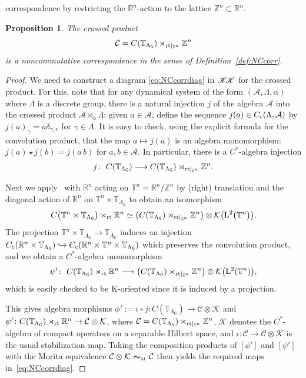 \documentclass[pdftex]{sigma}
\numberwithin{equation}{section}
\newcommand{\Z}{\zed}
\newcommand{\mbf}[1]{{\boldsymbol {#1} }}
\newcommand{\CCK}{\mathscr{K}}
\newcommand{\CK}{\mathcal{K}}
\newcommand{\Ccal}{\mathcal{C}}
\newcommand{\sfG}{\mathsf{G}}
\newcommand{\Leb}{{\rm L}}
\newcommand{\rt}{{\rm rt}}
\newcommand{\zed}{{\mathbb Z}} %
\newcommand{\real}{{\mathbb R}} %
\newcommand{\torus}{{\mathbb T}} %
\def\alg{{\mathcal A}}
\newtheorem{Proposition}[Theorem]{Proposition}
 { \theoremstyle{definition}
\newtheorem{Definition}[Theorem]{Definition}
\newtheorem{Note}[Theorem]{Note}
\newtheorem{Example}[Theorem]{Example}
\newtheorem{Remark}[Theorem]{Remark} }
\begin{document}
correspondence by restricting the $\real^n$-action to the lattice
$\zed^n\subset\real^n$.
\begin{Proposition}\label{prop:NCcorr}
The crossed product
\[
\Ccal=C(\torus_{\Lambda_\sfG})\rtimes_{\rt|_{\zed^n}} \zed^n
\]
is a {noncommutative correspondence} in the sense of
Definition~\ref{def:NCcorr}.
\end{Proposition}
\begin{proof}
We need to construct a diagram \eqref{eq:NCcorrdiag} in $\CCK\hspace{-1mm}\CCK$ for the
crossed product. For this,
note that for any dynamical system of the form $(\alg,\Lambda,\alpha)$
where $\Lambda$ is a discrete group, there is a
natural injection $j$ of the algebra $\alg$ into the crossed product
$\alg\rtimes_\alpha\Lambda$: given $a\in\alg$, define the sequence
$j(a)\in C_{\rm c}(\Lambda,\alg)$ by $j(a)_{\gamma}=a \delta_{\gamma,e}$ for $\gamma\in\Lambda$. It is
easy to check, using the explicit formula for the convolution product,
that the map $a\mapsto j(a)$ is an algebra
monomorphism:
$j(a)\star j(b)=j(a\,b)$ for $a,b\in\alg$. In particular,
there is a $C^*$-algebra injection
\begin{gather}\label{eq:jmono}
j\colon \ C(\torus_{\Lambda_\sfG})\longrightarrow
C(\torus_{\Lambda_\sfG})\rtimes_{\rt|_{\zed^n}} \zed^n .
\end{gather}

Next we apply~\cite[Corollary~2.8]{Green1980} with $\real^n$ acting on
$\torus^n=\real^n/\Z^n$ by (right) translation and the diagonal action of
$\real^n$ on $\torus^n\times\torus_{\Lambda_\sfG}$ to obtain an
isomorphism
\[
C\big(\torus^n\times\torus_{\Lambda_\sfG}\big)\rtimes_\rt\real^n \simeq
\big(C(\torus_{\Lambda_\sfG})\rtimes_{\rt|_{\Z^n}}\Z^n\big) \otimes
\CK\big(\Leb^2\big(\torus^n\big)\big) .
\]
The projection
$\torus^n\times\torus_{\Lambda_\sfG}\to\torus_{\Lambda_\sfG}$ induces an injection
$C_{\rm c}(\real^n\times\torus_{\Lambda_\sfG})\hookrightarrow
C_{\rm c}(\real^n\times\torus^n\times\torus_{\Lambda_{\sfG}})$ which preserves the
convolution product, and we obtain a $C^*$-algebra monomorphism
\[
\psi'\colon \ C(\torus_{\Lambda_\sfG})\rtimes_\rt\real^n\longrightarrow
\big(C(\torus_{\Lambda_\sfG})\rtimes_{\rt|_{\Z^n}}\Z^n\big) \otimes
\CK\big(\Leb^2(\torus^n)\big) ,
\]
which is easily checked to be K-oriented since it is induced by a
projection.

This gives algebra morphisms $\phi':=\iota\circ
j\colon C(\torus_{\Lambda_\sfG})\to\Ccal\otimes\CK$ and
$\psi'\colon C(\torus_{\Lambda_\sfG})\rtimes_\rt\real^n\to\Ccal\otimes\CK$,
where $\Ccal=C(\torus_{\Lambda_\sfG})\rtimes_{\rt|_{\zed^n}} \zed^n$, $\CK$ denotes the
$C^*$-algebra of compact operators on a
separable Hilbert space,
and $\iota\colon \Ccal\to\Ccal\otimes\CK$ is the usual stabilization map. Taking the composition products of $[\phi']$ and $[\psi']$ with the
Morita equivalence $\Ccal\otimes\CK \ \mbf\sim_{\text{\tiny M}} \
\Ccal$ then yields the required maps in~\eqref{eq:NCcorrdiag}.
\end{proof}
\end{document}
